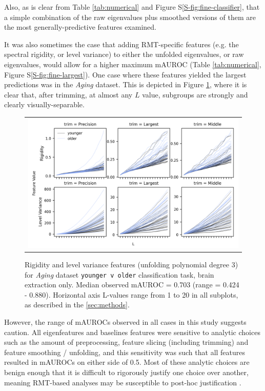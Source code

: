 \documentclass[12pt]{spieman}  %
\begin{document}
\begin{spacing}{2}
Also, as is clear from Table \ref{tab:numerical} and Figure S\ref{S-fig:fine-classifier}, that
a simple combination of the raw eigenvalues plus smoothed versions of them are the most
generally-predictive features examined.

It was also sometimes the case that adding RMT-specific features (e.g. the spectral
rigidity, or level variance) to either the unfolded eigenvalues, or raw
eigenvalues, would allow for a higher maximum mAUROC (Table
\ref{tab:numerical}, Figure S\ref{S-fig:fine-largest}). One case where these
features yielded the largest predictions was in the \textit{Aging} dataset.
This is depicted in Figure \ref{fig:observables}, where it is clear that, after
trimming, at almost any \(L\) value, subgroups are strongly and clearly
visually-separable.

\begin{figure}
\begin{center}
\begin{tabular}{c}
\includegraphics[width=6.5in]{observables_older_younger_v_older.png}
\end{tabular}
\end{center}
\caption
{ \label{fig:observables} Rigidity and level variance features (unfolding
polynomial degree 3) for \textit{Aging} dataset \footnotesize\texttt{younger v
older} classification task, brain extraction only. Median observed mAUROC =
0.703 (range = 0.424 - 0.880). Horizontal axis L-values range from 1 to 20 in
all subplots, as described in the \ref{sec:methods}.}
\end{figure}

However, the range of mAUROCs observed in all cases in this study suggests
caution. All eigenfeatures and baselines features were sensitive to analytic
choices such as the amount of preprocessing, feature slicing (including trimming) and
feature smoothing / unfolding, and this sensitivity was such that all features
resulted in mAUROCs on either side of 0.5. Most of these analytic choices are benign enough that
it is difficult to rigorously justify one choice over another, meaning RMT-based
analyses may be susceptible to post-hoc justification \cite{kerrHARKingHypothesizingResults1998}.


\end{spacing}
\end{document}
